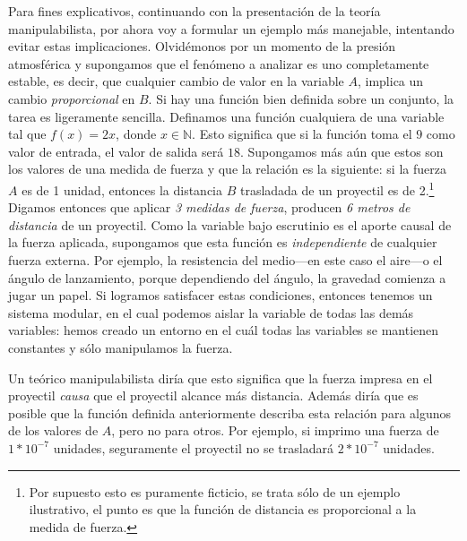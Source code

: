 Para fines explicativos, continuando con la presentación de
la teoría manipulabilista, por ahora voy a formular
un ejemplo más manejable, intentando evitar
estas implicaciones. Olvidémonos por un momento de la
presión atmosférica y supongamos que el fenómeno a analizar
es uno completamente estable, es decir, que cualquier cambio
de valor en la variable $ A $, implica un cambio
\emph{proporcional} en $ B $. Si hay una función bien
definida sobre un conjunto, la tarea es ligeramente
sencilla. Definamos una función cualquiera de una variable
tal que $ f(x) = 2x $, donde $ x \in  \mathbb{N} $. Esto
significa que si la función toma el $ 9 $ como valor de
entrada, el valor de salida será $ 18 $. Supongamos más aún
que estos son los valores de una medida de fuerza y que la
relación es la siguiente: si la fuerza $ A $ es de 1 unidad,
entonces la distancia $ B $ trasladada de un proyectil es de
2.\footnote{ 
	Por supuesto esto es puramente ficticio, se
	trata sólo de un ejemplo ilustrativo, el punto es
	que la función de distancia es proporcional a la
	medida de fuerza.
} 
Digamos entonces que aplicar \emph{3 medidas de fuerza},
producen \emph{6 metros de distancia} de un proyectil. Como
la variable bajo escrutinio es el aporte causal de la
fuerza aplicada, supongamos que esta función es
\emph{independiente} de cualquier fuerza externa. Por
ejemplo, la resistencia del medio---en este caso el aire---o
el ángulo de lanzamiento, porque dependiendo del ángulo, la gravedad
comienza a jugar un papel. Si logramos satisfacer estas
condiciones, entonces tenemos un sistema modular, en el cual
podemos aislar la variable  de todas las demás
variables: hemos creado un entorno en el cuál todas las
variables se mantienen constantes y sólo manipulamos la
fuerza.

Un teórico manipulabilista diría que esto significa que la
fuerza impresa en el proyectil \emph{causa} que el proyectil
alcance más distancia. Además diría que es posible que la
función definida anteriormente describa esta relación
para algunos de los valores de $ A $, pero no para otros.
Por ejemplo, si imprimo una fuerza de $ 1*10^{-7} $
unidades, seguramente el proyectil no se trasladará $
2*10^{-7} $ unidades.


